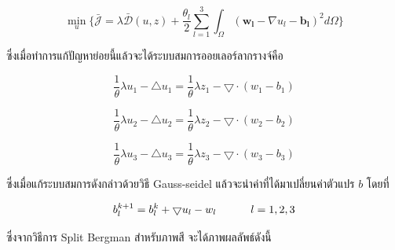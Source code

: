 \documentclass[hidelinks,a4paper,14pt]{article}
\numberwithin{equation}{section}							%
\begin{document}
{				$$ 
			\min_{u} \{\bar{\mathcal{J}}= \lambda \mathcal{\bar{D}}(u,z) + \frac{\theta_l}{2} \underset{l=1}{\overset{3}{\sum}}\int_{\Omega}^{}(\boldsymbol{w_l} - \nabla u_l - \boldsymbol{b_l})^{2}d\Omega\}
			$$
			
			ซึ่งเมื่อทำการแก้ปัญหาย่อยนี้แล้วจะได้ระบบสมการออยเลอร์ลากรางจ์คือ
			
			$$ \frac{1}{\theta}\lambda u_1 - \bigtriangleup u_1 = \frac{1}{\theta} \lambda z_1 - \bigtriangledown \cdot (w_1-b_1) $$
			
			$$ \frac{1}{\theta}\lambda u_2 - \bigtriangleup u_2 = \frac{1}{\theta} \lambda z_2 - \bigtriangledown \cdot (w_2-b_2) $$
			
			$$ \frac{1}{\theta}\lambda u_3 - \bigtriangleup u_3 = \frac{1}{\theta} \lambda z_3 - \bigtriangledown \cdot (w_3-b_3) $$
			
			ซึ่งเมื่อแก้ระบบสมการดังกล่าวด้วยวิธี Gauss-seidel แล้วจะนำค่าที่ได้มาเปลี่ยนค่าตัวแปร $b$ โดยที่
			
			$$ b_{l}^{k+1} = b_{l}^k  + \bigtriangledown u_{l} - w_{l} \hspace{1cm}  \hspace{0.1cm} l = 1,2,3 $$
			
			ซึ่งจากวิธีการ Split Bergman สำหรับภาพสี จะได้ภาพผลลัพธ์ดังนี้
			
}
\end{document}
